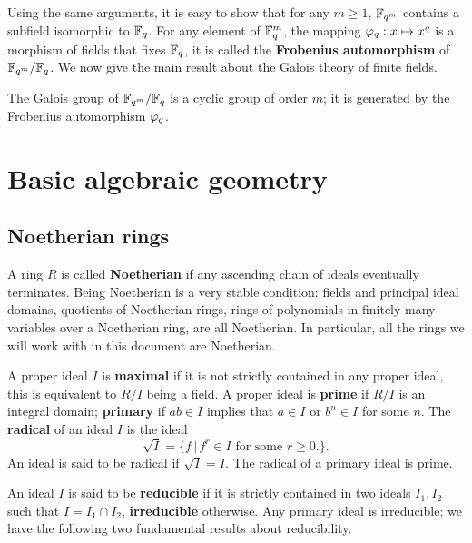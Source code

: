 Using the same arguments, it is easy to show that for any $m\ge 1$,
$\mathbb{F}_{q^m}$ contains a subfield isomorphic to $\mathbb{F}_q$.  For any element
of $\mathbb{F}_q^m$, the mapping $\varphi_q:x\mapsto
x^q$ is a
morphism of fields that fixes $\mathbb{F}_q$, it is called the
\textbf{Frobenius automorphism} of
$\mathbb{F}_{q^m}/\mathbb{F}_q$. We now give the main result about the Galois theory
of finite fields.

\begin{proposition}
  The Galois group of $\mathbb{F}_{q^m}/\mathbb{F}_q$ is a cyclic group of order $m$;
  it is generated by the Frobenius automorphism $\varphi_q$.
\end{proposition}


\section{Basic algebraic geometry}
\label{sec:basic-algebr-geom}

\subsection{Noetherian rings}
\label{sec:noetherian-rings}
A ring $R$ is called \textbf{Noetherian} if any
ascending chain of ideals eventually terminates. Being Noetherian is a
very stable condition: fields and principal ideal domains, quotients
of Noetherian rings, rings of polynomials in finitely many variables
over a Noetherian ring, are all Noetherian. In particular, all the
rings we will work with in this document are Noetherian.

A proper ideal $I$ is \textbf{maximal} if it is
not strictly contained in any proper ideal, this is equivalent to
$R/I$ being a field. A proper ideal is
\textbf{prime} if $R/I$ is an integral domain;
\textbf{primary} if $ab\in I$ implies that $a\in
I$ or $b^n\in I$ for some $n$. The
\textbf{radical} of an ideal $I$ is the
ideal
\begin{equation}
  \label{eq:212}
  \sqrt{I} = \{f \,|\, f^r\in I \text{ for some $r\ge0$.}\}
  \text{.}
\end{equation}
An ideal is said to be radical if $\sqrt{I}=I$. The radical of a
primary ideal is prime.

An ideal $I$ is said to be \textbf{reducible}
if it is strictly contained in two ideals $I_1,I_2$ such that
$I=I_1\cap I_2$, \textbf{irreducible}
otherwise. Any primary ideal is irreducible; we have the following two
fundamental results about reducibility.

